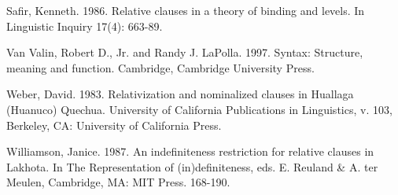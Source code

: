 \documentclass[output=paper]{LSP/langsci}
\begin{document}
\begin{reflist}
Safir, Kenneth. 1986. Relative clauses in a theory of binding and levels.  In Linguistic Inquiry 17(4): 663-89.

Van Valin, Robert D., Jr. and Randy J. LaPolla. 1997. Syntax: Structure, meaning and function. Cambridge, Cambridge University Press.

Weber, David. 1983. Relativization and nominalized clauses in Huallaga (Huanuco) Quechua.  University of California Publications in Linguistics, v. 103, Berkeley, CA: University of California Press.

Williamson, Janice. 1987. An indefiniteness restriction for relative clauses in Lakhota. In The Representation of (in)definiteness, eds. E. Reuland \& A. ter Meulen, Cambridge, MA: MIT Press. 168-190.

\end{reflist}
\end{document}
